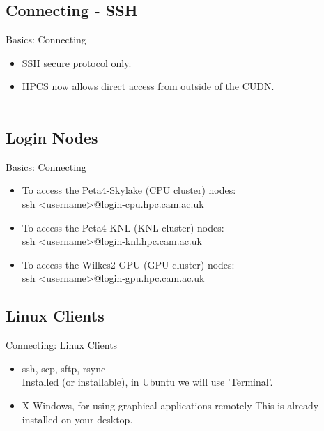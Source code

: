 \subsection{Connecting - SSH}
\begin{frame}{Basics: Connecting}
\begin{itemize}
\item SSH secure protocol only.\hfill\\
\item<3-> HPCS now allows direct access from outside of the CUDN.\hfill\\
\hfill\\
\end{itemize}
\end{frame}

\subsection{Login Nodes}
\begin{frame}{Basics: Connecting}
\begin{itemize}
\item To access the Peta4-Skylake (CPU cluster) nodes:\hfill\\
ssh \textless username\textgreater @login-cpu.hpc.cam.ac.uk
\item To access the Peta4-KNL (KNL cluster) nodes:\hfill\\
ssh \textless username\textgreater @login-knl.hpc.cam.ac.uk
\item To access the Wilkes2-GPU (GPU cluster) nodes:\hfill\\
ssh \textless username\textgreater @login-gpu.hpc.cam.ac.uk
\end{itemize}
\end{frame}

\subsection{Linux Clients}
\begin{frame}{Connecting: Linux Clients}
\begin{itemize}
\item {\color<2->{red}ssh}, scp, sftp, {rsync}\hfill\\
\alert{\small Installed (or installable), in Ubuntu we will use 'Terminal'.}
\item {X Windows, for using graphical applications remotely}
\alert{\small This is already installed on your desktop.}
\end{itemize}
\end{frame}

